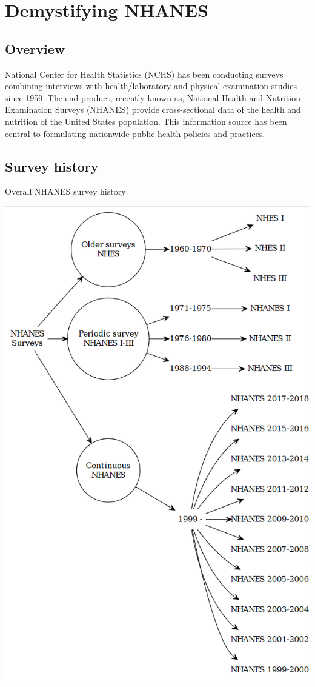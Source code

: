 \documentclass[
]{book}
\begin{document}
\hypertarget{demystifying-nhanes}{%
\chapter{Demystifying NHANES}\label{demystifying-nhanes}}

\hypertarget{overview}{%
\section{Overview}\label{overview}}

National Center for Health Statistics (NCHS) has been conducting surveys combining interviews with health/laboratory and physical examination studies since 1959. The end-product, recently known as, National Health and Nutrition Examination Surveys (NHANES) provide cross-sectional data of the health and nutrition of the United States population. This information source has been central to formulating nationwide public health policies and practices.

\hypertarget{survey-history}{%
\section{Survey history}\label{survey-history}}

Overall NHANES survey history

\includegraphics[width=0.65\linewidth]{images/g1}
\end{document}
